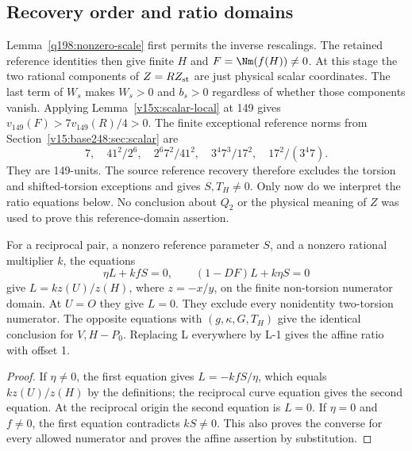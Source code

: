 \subsection{Recovery order and ratio domains}\label{q198:recovery-order}
Lemma~\ref{q198:nonzero-scale} first permits the inverse rescalings.
The retained reference identities then give finite $H$ and
$F=\Nm(f(H))\ne0$. At this stage the two rational components of
$Z=RZ_{\rm st}$ are just physical scalar coordinates.
The last term of $W_s$ makes $W_s>0$ and $b_s>0$ regardless of
whether those components vanish. Applying
Lemma~\ref{v15x:scalar-local} at 149 gives
$v_{149}(F)>7v_{149}(R)/4>0$. The finite exceptional reference
norms from Section~\ref{v15:base248:sec:scalar} are
\[
 7,\quad 41^2/2^6,\quad 2^6 7^2/41^2,\quad
 3^4 7^3/17^2,\quad 17^2/(3^4 7).
\]
They are 149-units. The source reference recovery therefore excludes
the torsion and shifted-torsion exceptions and gives $S,T_H\ne0$.
Only now do we interpret the ratio equations below. No conclusion
about $Q_2$ or the physical meaning of $Z$ was used to prove this
reference-domain assertion.

\begin{lemma}\label{q198:pair-ratios}
For a reciprocal pair, a nonzero reference parameter $S$, and a
nonzero rational multiplier $k$, the equations
\[
 \eta L+kfS=0,\qquad (1-DF)L+k\eta S=0
\]
give $L=kz(U)/z(H)$, where $z=-x/y$, on the finite non-torsion
numerator domain. At $U=O$ they give $L=0$. They exclude every
nonidentity two-torsion numerator. The opposite equations with
$(g,\kappa,G,T_H)$ give the identical conclusion for $V,H-P_0$.
Replacing L everywhere by L-1 gives the affine ratio with offset 1.
\end{lemma}
\begin{proof}
If $\eta\ne0$, the first equation gives $L=-kfS/\eta$,
which equals $kz(U)/z(H)$ by the definitions; the reciprocal curve
equation gives the second equation. At the reciprocal origin the
second equation is $L=0$. If $\eta=0$ and $f\ne0$, the first
equation contradicts $kS\ne0$. This also proves the converse for
every allowed numerator and proves the affine assertion by substitution.
\end{proof}


